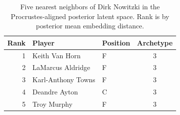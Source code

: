 \begin{table}[htbp]
  \centering\small
  \begin{tabular}{rllc}
    \toprule
    Rank & Player & Position & Archetype \\
    \midrule
    1 & Keith Van Horn & F & 3 \\
    2 & LaMarcus Aldridge & F & 3 \\
    3 & Karl-Anthony Towns & F & 3 \\
    4 & Deandre Ayton & C & 3 \\
    5 & Troy Murphy & F & 3 \\
    \bottomrule
  \end{tabular}
  \caption{Five nearest neighbors of Dirk Nowitzki in the Procrustes-aligned posterior latent space. Rank is by posterior mean embedding distance.}
  \label{tab:Dirk_Nowitzki_neighbors}
\end{table}

